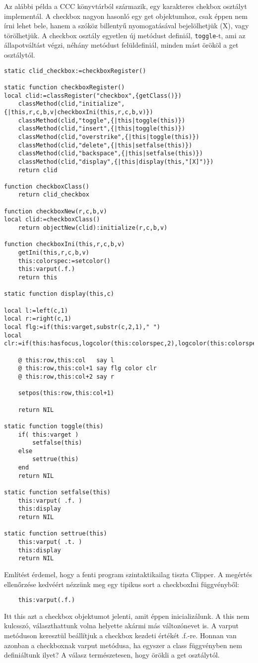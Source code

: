Az alábbi példa a  CCC könyvtárból származik, egy karakteres 
chekbox osztályt implementál. A checkbox nagyon hasonló
egy get objektumhoz, csak éppen nem írni lehet bele, hanem a szóköz
billentyű nyomogatásával bejelölhetjük (X), vagy törölhetjük.
A checkbox osztály egyetlen új metódust definiál, \verb!toggle!-t,
ami az állapotváltást végzi, néhány  metódust felüldefiniál,
minden mást örököl a get osztálytól.  
\begin{verbatim}
static clid_checkbox:=checkboxRegister()

static function checkboxRegister() 
local clid:=classRegister("checkbox",{getClass()})
    classMethod(clid,"initialize",{|this,r,c,b,v|checkboxIni(this,r,c,b,v)})
    classMethod(clid,"toggle",{|this|toggle(this)})
    classMethod(clid,"insert",{|this|toggle(this)})
    classMethod(clid,"overstrike",{|this|toggle(this)})
    classMethod(clid,"delete",{|this|setfalse(this)})
    classMethod(clid,"backspace",{|this|setfalse(this)})
    classMethod(clid,"display",{|this|display(this,"[X]")})
    return clid

function checkboxClass() 
    return clid_checkbox

function checkboxNew(r,c,b,v) 
local clid:=checkboxClass()
    return objectNew(clid):initialize(r,c,b,v)

function checkboxIni(this,r,c,b,v) 
    getIni(this,r,c,b,v)
    this:colorspec:=setcolor()
    this:varput(.f.)
    return this

static function display(this,c)

local l:=left(c,1)
local r:=right(c,1)
local flg:=if(this:varget,substr(c,2,1)," ")
local clr:=if(this:hasfocus,logcolor(this:colorspec,2),logcolor(this:colorspec,1))
    
    @ this:row,this:col   say l
    @ this:row,this:col+1 say flg color clr
    @ this:row,this:col+2 say r 

    setpos(this:row,this:col+1)

    return NIL

static function toggle(this)
    if( this:varget )
        setfalse(this)
    else
        settrue(this)
    end
    return NIL

static function setfalse(this)
    this:varput( .f. )
    this:display
    return NIL

static function settrue(this)
    this:varput( .t. )
    this:display
    return NIL
\end{verbatim}
Említést érdemel, hogy a fenti program szintaktikailag tiszta Clipper. 
A megértés ellenőrzése kedvéért nézzünk meg egy tipikus sort
a  checkboxIni függvényből:
\begin{verbatim}
    this:varput(.f.)
\end{verbatim}
Itt this azt a checkbox objektumot jelenti, amit éppen inicializálunk.
A this nem kulcsszó, választhattunk volna helyette akármi más változónevet is.
A varput metóduson keresztül beállítjuk a checkbox kezdeti értékét .f.-re.
Honnan van azonban a checkboxnak varput metódusa, ha egyszer a class
függvényben nem definiáltunk ilyet? A válasz természetesen, hogy
örökli a get osztálytól.
 

